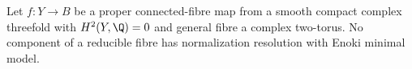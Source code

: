 \begin{proposition}\hypertarget{tag-01C1}{}\label{cdp:st:C.2.INT.2}



Let $f:Y\to B$ be a proper connected-fibre map from a
smooth compact complex threefold with $H^2(Y,\Q)=0$
and general fibre a complex two-torus. No component
of a reducible fibre has normalization resolution
with Enoki minimal model.
\end{proposition}
